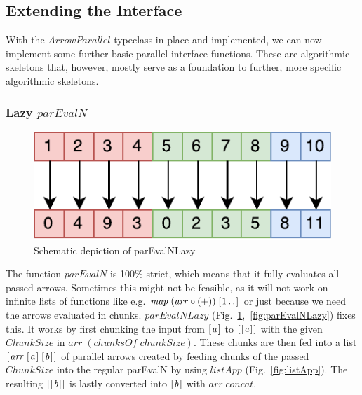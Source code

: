 \documentclass{jfp1}
\newcommand{\Conid}[1]{\mathit{#1}}
\newcommand{\Varid}[1]{\mathit{#1}}
\begin{document}
	\subsection{Extending the Interface}
\label{sec:extending-interface}
With the \ensuremath{\Conid{ArrowParallel}} typeclass in place and implemented, we can now implement some further basic parallel interface functions. These are algorithmic skeletons that, however, mostly serve as a foundation to further, more specific algorithmic skeletons.

\subsubsection{Lazy \ensuremath{\Varid{parEvalN}}}
\begin{figure}[h]
	\includegraphics[scale=0.7]{images/parEvalNLazy}
	\caption{Schematic depiction of parEvalNLazy}
	\label{fig:parEvalNLazyImg}
\end{figure}
The function \ensuremath{\Varid{parEvalN}} is 100\% strict, which means that it fully evaluates all passed arrows. Sometimes this might not be feasible, as it will not work on infinite lists of functions like e.g. \ensuremath{\Varid{map}\;(\Varid{arr}\mathbin{\circ}(\mathbin{+}))\;[\mskip1.5mu \mathrm{1}\mathinner{\ldotp\ldotp}\mskip1.5mu]} or just because we need the arrows evaluated in chunks. \ensuremath{\Varid{parEvalNLazy}} (Fig.~\ref{fig:parEvalNLazyImg},~\ref{fig:parEvalNLazy}) fixes this. It works by first chunking the input from \ensuremath{[\mskip1.5mu \Varid{a}\mskip1.5mu]} to \ensuremath{[\mskip1.5mu [\mskip1.5mu \Varid{a}\mskip1.5mu]\mskip1.5mu]} with the given \ensuremath{\Conid{ChunkSize}} in \ensuremath{\Varid{arr}\;(\Varid{chunksOf}\;\Varid{chunkSize})}. These chunks are then fed into a list \ensuremath{[\mskip1.5mu \Varid{arr}\;[\mskip1.5mu \Varid{a}\mskip1.5mu]\;[\mskip1.5mu \Varid{b}\mskip1.5mu]\mskip1.5mu]} of parallel arrows created by feeding chunks of the passed \ensuremath{\Conid{ChunkSize}} into the regular parEvalN by using \ensuremath{\Varid{listApp}} (Fig.~\ref{fig:listApp}). The resulting \ensuremath{[\mskip1.5mu [\mskip1.5mu \Varid{b}\mskip1.5mu]\mskip1.5mu]} is lastly converted into \ensuremath{[\mskip1.5mu \Varid{b}\mskip1.5mu]} with \ensuremath{\Varid{arr}\;\Varid{concat}}.
\end{document}
